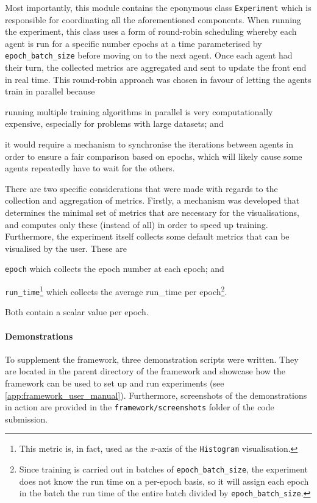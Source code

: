 Most importantly, this module contains the eponymous class \texttt{Experiment} which is responsible for coordinating all the aforementioned components.
When running the experiment, this class uses a form of round-robin scheduling whereby each agent is run for a specific number epochs at a time parameterised by \texttt{epoch\_batch\_size} before moving on to the next agent.
Once each agent had their turn, the collected metrics are aggregated and sent to update the front end in real time.
This round-robin approach was chosen in favour of letting the agents train in parallel because
\begin{enumerate*}[label=(\roman*)]
    \item running multiple training algorithms in parallel is very computationally expensive, especially for problems with large datasets; and
    \item it would require a mechanism to synchronise the iterations between agents in order to ensure a fair comparison based on epochs, which will likely cause some agents repeatedly have to wait for the others.
\end{enumerate*}

There are two specific considerations that were made with regards to the collection and aggregation of metrics. 
Firstly, a mechanism was developed that determines the minimal set of metrics that are necessary for the visualisations, and computes only these (instead of all) in order to speed up training.
Furthermore, the experiment itself collects some default metrics that can be visualised by the user.
These are
\begin{enumerate*}[label=(\roman*)]
    \item \texttt{epoch} which collects the epoch number at each epoch; and
    \item \texttt{run\_time}\footnote{This metric is, in fact, used as the $x$-axis of the \texttt{Histogram} visualisation.} which collects the average run\_time per epoch\footnote{Since training is carried out in batches of \texttt{epoch\_batch\_size}, the experiment does not know the run time on a per-epoch basis, so it will assign each epoch in the batch the run time of the entire batch divided by \texttt{epoch\_batch\_size}.}.
\end{enumerate*}
Both contain a scalar value per epoch.

\paragraph{Demonstrations}
To supplement the framework, three demonstration scripts were written.
They are located in the parent directory of the framework and showcase how the framework can be used to set up and run experiments (see \ref{app:framework_user_manual}).
Furthermore, screenshots of the demonstrations in action are provided in the \texttt{framework/screenshots} folder of the code submission.

